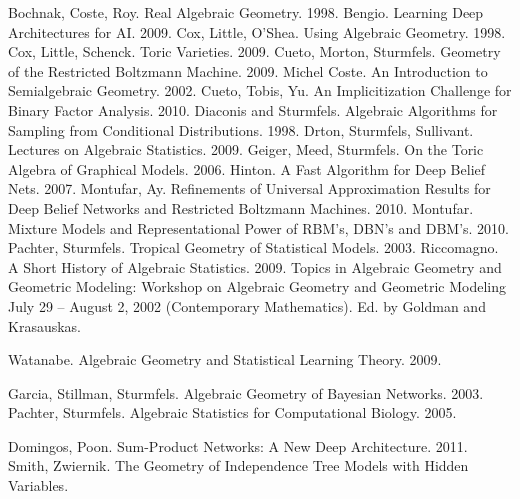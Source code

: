 \documentclass[11pt]{article}
\begin{document}
\begin{thebibliography}{100}
     Bochnak, Coste, Roy.  Real Algebraic Geometry.  1998.
     Bengio.  Learning Deep Architectures for AI. 2009.
     Cox, Little, O'Shea.  Using Algebraic Geometry.  1998.
     Cox, Little, Schenck.  Toric Varieties.  2009.
     Cueto, Morton, Sturmfels. Geometry of the Restricted Boltzmann Machine.  2009.
     Michel Coste.  An Introduction to Semialgebraic Geometry.  2002.
     Cueto, Tobis, Yu.  An Implicitization Challenge for Binary Factor Analysis. 
    2010.
     Diaconis and Sturmfels.  Algebraic Algorithms for Sampling
    from Conditional Distributions. 1998.
     Drton, Sturmfels, Sullivant. Lectures on Algebraic
    Statistics. 2009.
     Geiger, Meed, Sturmfels.  On the Toric Algebra of Graphical Models. 2006.
     Hinton.  A Fast Algorithm for Deep Belief Nets.  2007.
     Montufar, Ay.  Refinements of Universal Approximation
    Results for Deep Belief Networks and Restricted Boltzmann Machines.  2010.
     Montufar.  Mixture Models and Representational Power of
    RBM's, DBN's and DBM's.  2010.
     Pachter, Sturmfels.  Tropical Geometry of Statistical Models. 2003.
     Riccomagno.  A Short History of Algebraic Statistics.  2009.
     Topics in Algebraic Geometry and Geometric Modeling:
    Workshop on Algebraic Geometry and Geometric Modeling July 29 -- August 2,
    2002 (Contemporary Mathematics).  Ed. by Goldman and Krasauskas.

     Watanabe.  Algebraic Geometry and Statistical Learning Theory.  2009.

     Garcia, Stillman, Sturmfels.  Algebraic Geometry of Bayesian Networks.  2003.
     Pachter, Sturmfels.  Algebraic Statistics for Computational Biology.  2005.

     Domingos, Poon. Sum-Product Networks: A New Deep Architecture. 2011.
     Smith, Zwiernik.  The Geometry of Independence Tree Models with Hidden Variables.
\end{thebibliography}
\end{document}
